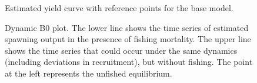 \documentclass[
]{scrartcl}
\begin{document}
\begin{figure}[H]


\caption{\label{fig-yield}Estimated yield curve with reference points
for the base model.}

\end{figure}%

\begin{figure}[H]


\caption{\label{fig-dyn-b0}Dynamic B0 plot. The lower line shows the
time series of estimated spawning output in the presence of fishing
mortality. The upper line shows the time series that could occur under
the same dynamics (including deviations in recruitment), but without
fishing. The point at the left represents the unfished equilibrium.}

\end{figure}%
\end{document}
